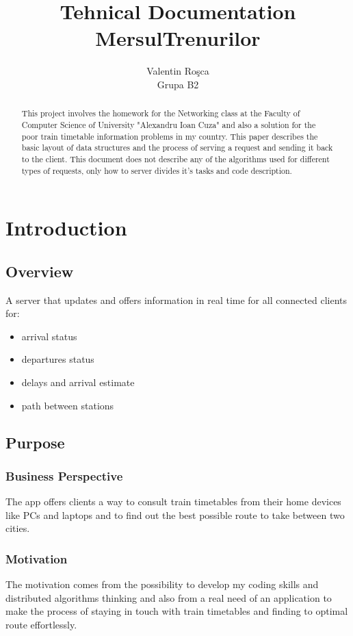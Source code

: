 \documentclass{llncs}
\title{Tehnical Documentation MersulTrenurilor}
\author{Valentin Ro\c sca \\ Grupa B2}
\institute{Faculty of Computer Science of University "Alexandru Ioan Cuza"}
\begin{document}
	\maketitle
	\newpage
	
	\begin{abstract}
		This project involves the homework for the Networking class at the Faculty of Computer Science of University "Alexandru Ioan Cuza" and also a solution for the poor train timetable information problems in my country. This paper describes the basic layout of data structures and the process of serving a request and sending it back to the client. This document does not describe any of the algorithms used for different types of requests, only how to server divides it's tasks and code description.
	\end{abstract}

	\section[Introduction]{Introduction}
		\subsection{Overview}
		A server that updates and offers information in real time for all connected clients for:
		\begin{itemize}
			\item arrival status
			\item departures status
			\item delays and arrival estimate
			\item path between stations
		\end{itemize}
	
		\subsection{Purpose}
			\subsubsection{Business Perspective}
				The app offers clients a way to consult train timetables from their home devices like PCs and laptops and to find out the best possible route to take between two cities.
			\subsubsection{Motivation}
				The motivation comes from the possibility to develop my coding skills and distributed algorithms thinking and also from a real need of an application to make the process of staying in touch with train timetables and finding to optimal route effortlessly.
\end{document}

